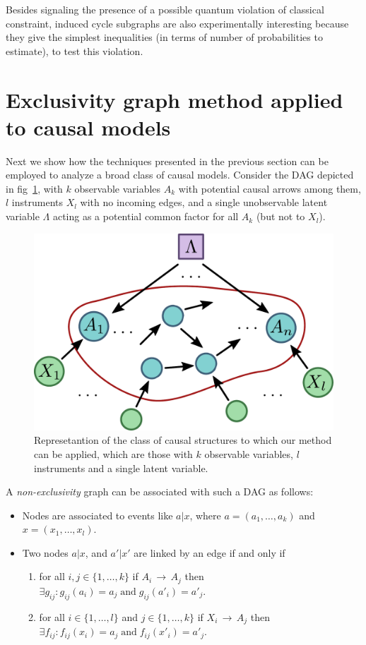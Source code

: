 \documentclass[letterpaper]{article}
\newcommand{\et}{\;\mathrm{and}\;}
\begin{document}
Besides signaling the presence of a possible quantum violation of classical
constraint, induced cycle subgraphs are also experimentally interesting because
they give the simplest inequalities (in terms of number of probabilities to
estimate), to test this violation.

\section{Exclusivity graph method applied to causal models}
Next we show how the techniques presented in the previous section can be employed to analyze
a broad class of causal models. Consider the DAG depicted in fig~\ref{fig:onelambda}, with
$k$ observable variables $A_k$ with potential causal arrows among them, $l$
instruments $X_l$ with no incoming edges, and a single unobservable latent
variable $\Lambda$ acting as a potential common factor for all $A_k$ (but not to
$X_l$).

\begin{figure}[h]
    \centering
    \includegraphics[width=.9\columnwidth]{images/onelambda.pdf}
    \caption{Represetantion of the class of causal structures to which our
        method can be applied, which are those with $k$ observable variables, $l$
        instruments and a single latent variable.}
    \label{fig:onelambda}
\end{figure}

A \emph{non-exclusivity} graph can be associated with such a DAG
as follows:
\begin{itemize}
    \item Nodes are associated to events like $a | x$, where $a = (a_1,\ldots,a_k)$ and  $x = (x_1,\ldots,x_l)$.
    \item Two nodes $a | x $, and $a' | x'$ are linked by an edge if and only if 
        \begin{enumerate}
            \item for all $i,j \in \{1 ,\ldots,k\}$ if $A_i\,
                \rightarrow\, A_j$ then $\exists g_{ij} : g_{ij}(a_i) = a_j
                \et g_{ij}(a'_i) = a'_j$.
            \item for all $i\in \{1,\ldots,l\}$ and $j\in \{1,\ldots,k\}$ if
                $X_i\,\rightarrow\,A_j$ then $\exists f_{ij} : f_{ij}(x_i) = a_j
                \et f_{ij}(x'_i) = a'_j$.
        \end{enumerate}
\end{itemize}
\end{document}
